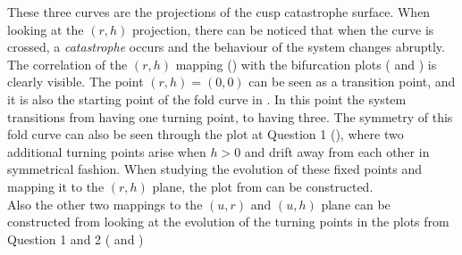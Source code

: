 \documentclass[a4paper,11pt]{article}
\begin{document}
These three curves are the projections of the cusp catastrophe surface. When looking at the $(r,h)$ projection,
there can be noticed that when the curve is crossed, a \textit{catastrophe} occurs and the behaviour of the system
changes abruptly.\\
The correlation of the $(r,h)$ mapping () with the bifurcation plots ( and )
is clearly visible. The point $(r,h)=(0,0)$ can be seen as a transition point, and it is also the starting point
of the fold curve in . In this point the system transitions from having one turning point, to having
three. The symmetry of this fold curve can also be seen through the plot at Question 1 (), where 
two additional turning points arise when $h>0$ and drift away from each other in symmetrical fashion. When studying the evolution
of these fixed points and mapping it to the $(r,h)$ plane, the plot from  can be constructed.\\
Also the other two mappings to the $(u,r)$ and $(u,h)$ plane can be constructed from looking at the evolution 
of the turning points in the plots from Question 1 and 2 ( and )
\end{document}
